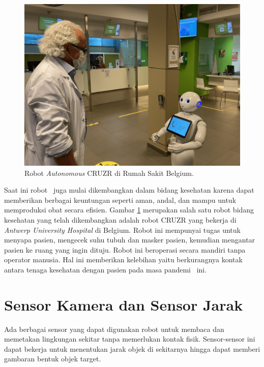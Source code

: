     \begin{figure}[!ht]
        \centering
        \includegraphics[scale=0.3]{robot_cruzr.png}
        \caption{Robot \textit{Autonomous} CRUZR di Rumah Sakit Belgium\cite{b2.1}.}
        \label{fig:Ch02_robot_CRUZR}
    \end{figure}
    
    Saat ini robot \auto\ juga mulai dikembangkan dalam bidang kesehatan karena dapat memberikan berbagai keuntungan seperti aman, andal, dan mampu untuk memproduksi obat secara efisien\cite{b2}. Gambar \ref{fig:Ch02_robot_CRUZR} merupakan salah satu robot bidang kesehatan yang telah dikembangkan adalah robot CRUZR yang bekerja di \textit{Antwerp University Hospital} di Belgium\cite{b2.1}. Robot ini mempunyai tugas untuk menyapa pasien, mengecek suhu tubuh dan masker pasien, kemudian mengantar pasien ke ruang yang ingin dituju. Robot ini beroperasi secara mandiri tanpa operator manusia. Hal ini memberikan kelebihan yaitu berkurangnya kontak antara tenaga kesehatan dengan pasien pada masa pandemi \covid\ ini.
    
   
   
\section{Sensor Kamera dan Sensor Jarak}
\label{sec:sensor}  
   Ada berbagai sensor yang dapat digunakan robot untuk membaca dan memetakan lingkungan sekitar tanpa memerlukan kontak fisik. Sensor-sensor ini dapat bekerja untuk menentukan jarak objek di sekitarnya hingga dapat memberi gambaran bentuk objek target. 
   
